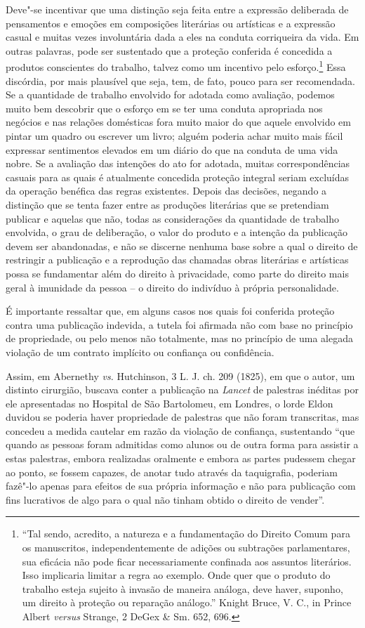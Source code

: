 Deve"-se incentivar que uma distinção seja feita entre a expressão
deliberada de pensamentos e emoções em composições literárias ou
artísticas e a expressão casual e muitas vezes involuntária dada a eles
na conduta corriqueira da vida. Em outras palavras, pode ser sustentado
que a proteção conferida é concedida a produtos conscientes do trabalho,
talvez como um incentivo pelo esforço.\footnote{``Tal sendo, acredito, a
  natureza e a fundamentação do Direito Comum para os manuscritos,
  independentemente de adições ou subtrações parlamentares, sua eficácia
  não pode ficar necessariamente confinada aos assuntos literários. Isso
  implicaria limitar a regra ao exemplo. Onde quer que o produto do
  trabalho esteja sujeito à invasão de maneira análoga, deve haver,
  suponho, um direito à proteção ou reparação análogo.'' Knight Bruce,
  V. C., in Prince Albert \emph{versus} Strange, 2 DeGex \& Sm. 652,
  696.} Essa discórdia, por mais plausível que seja, tem, de fato, pouco
para ser recomendada. Se a quantidade de trabalho envolvido for adotada
como avaliação, podemos muito bem descobrir que o esforço em se ter uma
conduta apropriada nos negócios e nas relações domésticas fora muito
maior do que aquele envolvido em pintar um quadro ou escrever um livro;
alguém poderia achar muito mais fácil expressar sentimentos elevados em
um diário do que na conduta de uma vida nobre. Se a avaliação das
intenções do ato for adotada, muitas correspondências casuais para as
quais é atualmente concedida proteção integral seriam excluídas da
operação benéfica das regras existentes. Depois das decisões, negando a
distinção que se tenta fazer entre as produções literárias que se
pretendiam publicar e aquelas que não, todas as considerações da
quantidade de trabalho envolvida, o grau de deliberação, o valor do
produto e a intenção da publicação devem ser abandonadas, e não se
discerne nenhuma base sobre a qual o direito de restringir a publicação
e a reprodução das chamadas obras literárias e artísticas possa se
fundamentar além do direito à privacidade, como parte do direito mais
geral à imunidade da pessoa -- o direito do indivíduo à própria
personalidade.

É importante ressaltar que, em alguns casos nos quais foi conferida
proteção contra uma publicação indevida, a tutela foi afirmada não com
base no princípio de propriedade, ou pelo menos não totalmente, mas no
princípio de uma alegada violação de um contrato implícito ou confiança
ou confidência.

Assim, em Abernethy \emph{vs.} Hutchinson, 3 L. J. ch. 209 (1825), em
que o autor, um distinto cirurgião, buscava conter a publicação na
\emph{Lancet} de palestras inéditas por ele apresentadas no Hospital de
São Bartolomeu, em Londres, o lorde Eldon duvidou se poderia haver
propriedade de palestras que não foram transcritas, mas concedeu a
medida cautelar em razão da violação de confiança, sustentando ``que
quando as pessoas foram admitidas como alunos ou de outra forma para
assistir a estas palestras, embora realizadas oralmente e embora as
partes pudessem chegar ao ponto, se fossem capazes, de anotar tudo
através da taquigrafia, poderiam fazê"-lo apenas para efeitos de sua
própria informação e não para publicação com fins lucrativos de algo
para o qual não tinham obtido o direito de vender''.

